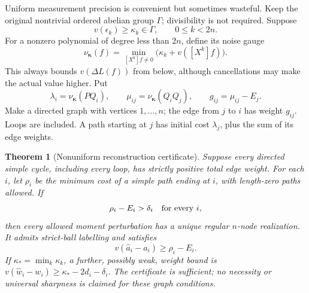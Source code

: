 \documentclass[11pt,letterpaper]{article}
\newtheorem{theorem}{Theorem}[section]
\theoremstyle{definition}
\theoremstyle{remark}
\newcommand{\ah}{\widehat a}
\newcommand{\wh}{\widehat w}
\begin{document}
Uniform measurement precision is convenient but sometimes wasteful.
Keep the original nontrivial ordered abelian group $\Gamma$; divisibility
is not required. Suppose
\[
 v(\epsilon_k)\ge\kappa_k\in\Gamma,\qquad 0\le k<2n.
\]
For a nonzero polynomial of degree less than $2n$, define its noise gauge
\begin{equation}\label{prony:eq:noisegauge}
 \nu_{\boldsymbol\kappa}(f)
 =\min_{[X^k]f\ne0}\bigl(\kappa_k+v([X^k]f)\bigr).
\end{equation}
This always bounds $v(\Delta L(f))$ from below, although cancellations may
make the actual value higher. Put
\begin{equation}\label{prony:eq:graphedges}
 \lambda_i=\nu_{\boldsymbol\kappa}(PQ_i),\qquad
 \mu_{ij}=\nu_{\boldsymbol\kappa}(Q_iQ_j),\qquad
 g_{ij}=\mu_{ij}-E_j.
\end{equation}
Make a directed graph with vertices $1,\ldots,n$; the edge from $j$ to $i$
has weight $g_{ij}$. Loops are included. A path starting at $j$ has initial
cost $\lambda_j$, plus the sum of its edge weights.

\begin{theorem}[Nonuniform reconstruction certificate]\label{prony:thm:graph}
Suppose every directed simple cycle, including every loop, has strictly
positive total edge weight. For each $i$, let $\rho_i$ be the minimum cost
of a simple path ending at $i$, with length-zero paths allowed. If
\begin{equation}\label{prony:eq:graphcondition}
 \rho_i-E_i>\delta_i\quad\hbox{for every }i,
\end{equation}
then every allowed moment perturbation has a unique regular $n$-node
realization. It admits strict-ball labelling and satisfies
\begin{equation}\label{prony:eq:graphnode}
 v(\ah_i-a_i)\ge\rho_i-E_i.
\end{equation}
If $\kappa_* =\min_k\kappa_k$, a further, possibly weak, weight bound is
$v(\wh_i-w_i)\ge\kappa_*-2d_i-\delta_i$.
The certificate is sufficient; no necessity or universal sharpness is
claimed for these graph conditions.
\end{theorem}
\end{document}
